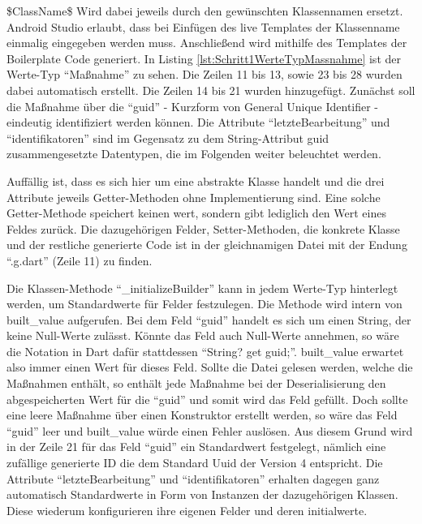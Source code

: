 \$ClassName\$ Wird dabei jeweils durch den gewünschten Klassennamen ersetzt. Android Studio erlaubt, dass bei Einfügen des live Templates der Klassenname einmalig eingegeben werden muss.  Anschließend wird mithilfe des Templates der Boilerplate Code generiert. In Listing \ref{lst:Schritt1WerteTypMassnahme} ist der Werte-Typ \enquote{Maßnahme} zu sehen. Die Zeilen 11 bis 13, sowie 23 bis 28 wurden dabei automatisch erstellt. Die Zeilen 14 bis 21 wurden hinzugefügt. Zunächst soll die Maßnahme über die \enquote{guid} - Kurzform von General Unique Identifier - eindeutig identifiziert werden können.
Die Attribute \enquote{letzteBearbeitung} und \enquote{identifikatoren} sind im Gegensatz zu dem String-Attribut guid zusammengesetzte Datentypen, die im Folgenden weiter beleuchtet werden.

Auffällig ist, dass es sich hier um eine abstrakte Klasse handelt und die drei Attribute jeweils Getter-Methoden ohne Implementierung sind. Eine solche Getter-Methode speichert keinen wert, sondern gibt lediglich den Wert eines Feldes zurück. Die dazugehörigen Felder,  Setter-Methoden, die konkrete Klasse und der restliche generierte Code ist in der gleichnamigen Datei mit der Endung \enquote{.g.dart} (Zeile 11) zu finden.

Die Klassen-Methode \enquote{_initializeBuilder} kann in jedem Werte-Typ hinterlegt werden, um Standardwerte für Felder festzulegen.
Die Methode wird intern von built_value aufgerufen. Bei dem Feld \enquote{guid} handelt es sich um einen String, der keine Null-Werte zulässt. Könnte das Feld auch Null-Werte annehmen, so wäre die Notation in Dart dafür stattdessen \enquote{String? get guid;}. built_value erwartet also immer einen Wert für dieses Feld. Sollte die Datei gelesen werden, welche die Maßnahmen enthält, so enthält jede Maßnahme bei der Deserialisierung den abgespeicherten Wert für die \enquote{guid} und somit wird das Feld gefüllt. Doch sollte eine leere Maßnahme über einen Konstruktor erstellt werden, so wäre das Feld \enquote{guid} leer und built_value würde einen Fehler auslösen. Aus diesem Grund wird in der Zeile 21 für das Feld \enquote{guid} ein Standardwert festgelegt, nämlich eine zufällige  generierte ID die dem Standard Uuid der Version 4 entspricht.
Die Attribute \enquote{letzteBearbeitung} und \enquote{identifikatoren} erhalten dagegen ganz automatisch Standardwerte in Form von Instanzen der dazugehörigen Klassen. Diese wiederum konfigurieren ihre eigenen Felder und deren initialwerte.

